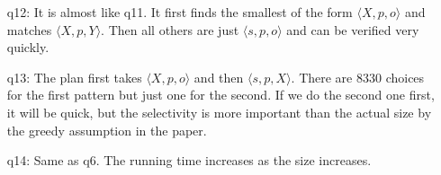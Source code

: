 \documentclass{article}
\begin{document}
\begin{enumerate}
\begin{enumerate}
\item[q12:] It is almost like q11. It first finds the smallest of the form $\langle X, p, o\rangle$ and matches $\langle X, p, Y\rangle$. Then all others are just $\langle s, p, o\rangle$ and can be verified very quickly. 
\item[q13:]  The plan first takes $\langle X, p, o\rangle$ and then $\langle s, p, X\rangle$. There are 8330 choices for the first pattern but just one for the second. If we do the second one first, it will be quick, but the selectivity is more important than the actual size by the greedy assumption in the paper. 
\item[q14:] Same as q6. The running time increases as the size increases. 
\end{enumerate}
\end{enumerate}
\end{document}
